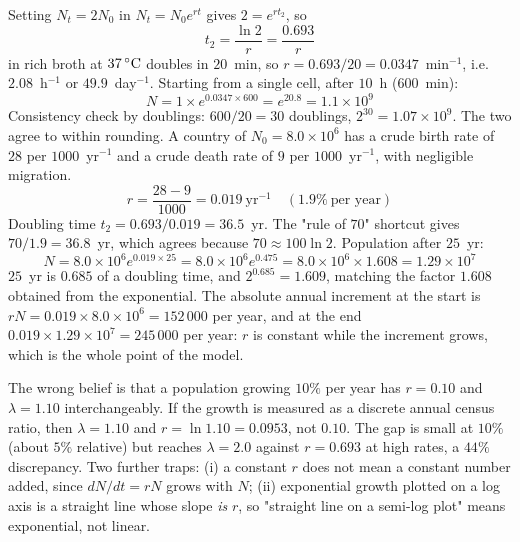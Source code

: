 \begin{calcbox}[title={WORKED: doubling time and projection}]
Setting $N_t=2N_0$ in $N_t=N_0e^{rt}$ gives $2=e^{rt_2}$, so
\[
t_2=\frac{\ln 2}{r}=\frac{0.693}{r}
\]
  in rich broth at $37\,^{\circ}\mathrm{C}$ doubles in
$20$~min, so
$r=0.693/20=0.0347$~min$^{-1}$, i.e. $2.08$~h$^{-1}$ or $49.9$~day$^{-1}$.
Starting from a single cell, after $10$~h ($600$~min):
\[
N=1\times e^{0.0347\times600}=e^{20.8}=1.1\times10^{9}
\]
Consistency check by doublings: $600/20=30$ doublings, $2^{30}=1.07\times10^{9}$.
The two agree to within rounding. \tm{$\surd$}
 A country of $N_0=8.0\times10^{6}$ has a
crude birth rate of $28$ per $1000$~yr$^{-1}$ and a crude death rate of $9$ per
$1000$~yr$^{-1}$, with negligible migration.
\[
r=\frac{28-9}{1000}=0.019\ \mathrm{yr^{-1}}\quad(1.9\%\ \text{per year})
\]
Doubling time $t_2=0.693/0.019=36.5$~yr. The "rule of $70$" shortcut gives
$70/1.9=36.8$~yr, which agrees because $70\approx 100\ln 2$.
Population after $25$~yr:
\[
N=8.0\times10^{6}e^{0.019\times25}=8.0\times10^{6}e^{0.475}
=8.0\times10^{6}\times1.608=1.29\times10^{7}
\]
 $25$~yr is $0.685$ of a doubling time, and
$2^{0.685}=1.609$, matching the factor $1.608$ obtained from the exponential.
The absolute annual increment at the start is
$rN=0.019\times8.0\times10^{6}=152\,000$ per year, and at the end
$0.019\times1.29\times10^{7}=245\,000$ per year: $r$ is constant while the
increment grows, which is the whole point of the model. \tm{$\surd$}
\end{calcbox}

\begin{warnbox}[title={TRAP: $r$, $\lambda$ and percentage growth are three different numbers}]
The wrong belief is that a population growing $10\%$ per year has $r=0.10$ and
$\lambda=1.10$ interchangeably. If the growth is measured as a discrete annual
census ratio, then $\lambda=1.10$ and $r=\ln 1.10=0.0953$, not $0.10$. The gap
is small at $10\%$ (about $5\%$ relative) but reaches $\lambda=2.0$ against
$r=0.693$ at high rates, a $44\%$ discrepancy. Two further traps: (i) a constant
$r$ does not mean a constant number added, since $dN/dt=rN$ grows with $N$;
(ii) exponential growth plotted on a log axis is a straight line whose slope
\emph{is} $r$, so "straight line on a semi-log plot" means exponential, not
linear.
\end{warnbox}

